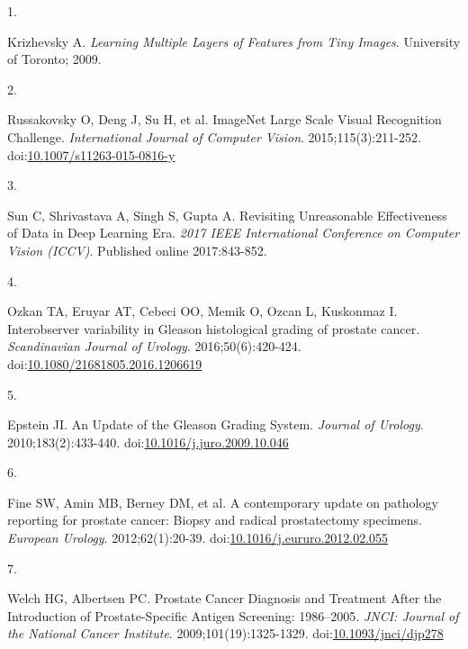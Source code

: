 \documentclass[
  12pt,
  a5,margin=2cmpaper,
]{article}
\newlength{\cslhangindent}
\newlength{\csllabelwidth}
\newlength{\cslentryspacingunit} %
\newenvironment{CSLReferences}[2] %
 {%
  \setlength{\parindent}{0pt}
  \ifodd #1
  \let\oldpar\par
  \def\par{\hangindent=\cslhangindent\oldpar}
  \fi
  \setlength{\parskip}{#2\cslentryspacingunit}
 }%
 {}
\newcommand{\CSLLeftMargin}[1]{\parbox[t]{\csllabelwidth}{#1}}
\newcommand{\CSLRightInline}[1]{\parbox[t]{\linewidth - \csllabelwidth}{#1}\break}
\begin{document}
\hypertarget{refs}{}
\begin{CSLReferences}{0}{0}
\leavevmode{}%
\CSLLeftMargin{1. }%
\CSLRightInline{Krizhevsky A. \emph{{Learning Multiple Layers of
Features from Tiny Images}}. University of Toronto; 2009.}

\leavevmode{}%
\CSLLeftMargin{2. }%
\CSLRightInline{Russakovsky O, Deng J, Su H, et al. {ImageNet Large
Scale Visual Recognition Challenge}. \emph{International Journal of
Computer Vision}. 2015;115(3):211-252.
doi:\href{https://doi.org/10.1007/s11263-015-0816-y}{10.1007/s11263-015-0816-y}}

\leavevmode{}%
\CSLLeftMargin{3. }%
\CSLRightInline{Sun C, Shrivastava A, Singh S, Gupta A. {Revisiting
Unreasonable Effectiveness of Data in Deep Learning Era}. \emph{2017
IEEE International Conference on Computer Vision (ICCV)}. Published
online 2017:843-852.}

\leavevmode{}%
\CSLLeftMargin{4. }%
\CSLRightInline{Ozkan TA, Eruyar AT, Cebeci OO, Memik O, Ozcan L,
Kuskonmaz I. {Interobserver variability in Gleason histological grading
of prostate cancer}. \emph{Scandinavian Journal of Urology}.
2016;50(6):420-424.
doi:\href{https://doi.org/10.1080/21681805.2016.1206619}{10.1080/21681805.2016.1206619}}

\leavevmode{}%
\CSLLeftMargin{5. }%
\CSLRightInline{Epstein JI. {An Update of the Gleason Grading System}.
\emph{Journal of Urology}. 2010;183(2):433-440.
doi:\href{https://doi.org/10.1016/j.juro.2009.10.046}{10.1016/j.juro.2009.10.046}}

\leavevmode{}%
\CSLLeftMargin{6. }%
\CSLRightInline{Fine SW, Amin MB, Berney DM, et al. {A contemporary
update on pathology reporting for prostate cancer: Biopsy and radical
prostatectomy specimens}. \emph{European Urology}. 2012;62(1):20-39.
doi:\href{https://doi.org/10.1016/j.eururo.2012.02.055}{10.1016/j.eururo.2012.02.055}}

\leavevmode{}%
\CSLLeftMargin{7. }%
\CSLRightInline{Welch HG, Albertsen PC. {Prostate Cancer Diagnosis and
Treatment After the Introduction of Prostate-Specific Antigen Screening:
1986--2005}. \emph{JNCI: Journal of the National Cancer Institute}.
2009;101(19):1325-1329.
doi:\href{https://doi.org/10.1093/jnci/djp278}{10.1093/jnci/djp278}}


\end{CSLReferences}
\end{document}

